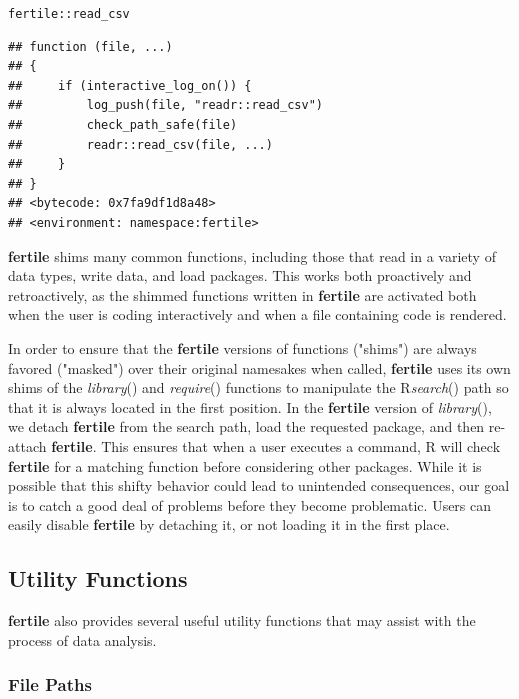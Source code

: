 \documentclass[APA,LATO1COL]{WileyNJD-v2}\usepackage[]{graphicx}\usepackage[]{color}
\makeatletter
\newcommand{\hlopt}[1]{\textcolor[rgb]{0,0,0}{#1}}%
\newcommand{\hlstd}[1]{\textcolor[rgb]{0.345,0.345,0.345}{#1}}%
\newenvironment{kframe}{%
 \def\at@end@of@kframe{}%
 \ifinner\ifhmode%
  \def\at@end@of@kframe{\end{minipage}}%
  \begin{minipage}{\columnwidth}%
 \fi\fi%
 \def\FrameCommand##1{\hskip\@totalleftmargin \hskip-\fboxsep
 \colorbox{shadecolor}{##1}\hskip-\fboxsep
     \hskip-\linewidth \hskip-\@totalleftmargin \hskip\columnwidth}%
 \MakeFramed {\advance\hsize-\width
   \@totalleftmargin\z@ \linewidth\hsize
   \@setminipage}}%
 {\par\unskip\endMakeFramed%
 \at@end@of@kframe}
\newenvironment{knitrout}{}{} %
\newcommand{\R}{\textsf{R}\xspace}
\newcommand{\pkg}[1]{\textbf{#1}}
\newcommand{\func}[1]{\textit{#1}()}
\makeatother
\begin{document}
\begin{knitrout}
\color{fgcolor}\begin{kframe}
\begin{alltt}
\hlstd{fertile}\hlopt{::}\hlstd{read_csv}
\end{alltt}
\begin{verbatim}
## function (file, ...) 
## {
##     if (interactive_log_on()) {
##         log_push(file, "readr::read_csv")
##         check_path_safe(file)
##         readr::read_csv(file, ...)
##     }
## }
## <bytecode: 0x7fa9df1d8a48>
## <environment: namespace:fertile>
\end{verbatim}
\end{kframe}
\end{knitrout}

\pkg{fertile} shims many common functions, including those that read in a variety of data types, write data, and load packages. This works both proactively and retroactively, as the shimmed functions written in \pkg{fertile} are activated both when the user is coding interactively and when a file containing code is rendered.

In order to ensure that the \pkg{fertile} versions of functions ("shims") are always favored ("masked") over their original namesakes when called, \pkg{fertile} uses its own shims of the \func{library} and \func{require} functions to  manipulate the \R \func{search} path so that it is always located in the first position. In the \pkg{fertile} version of \func{library}, we detach \pkg{fertile} from the search path, load the requested package, and then re-attach \pkg{fertile}. This ensures that when a user executes a command, \R will check \pkg{fertile} for a matching function before considering other packages. While it is possible that this shifty behavior could lead to unintended consequences, our goal is to catch a good deal of problems before they become problematic. Users can easily disable \pkg{fertile} by detaching it, or not loading it in the first place. 


\subsection{Utility Functions}

\pkg{fertile} also provides several useful utility functions that may assist with the process of data analysis. 

\subsubsection{File Paths}
\end{document}
